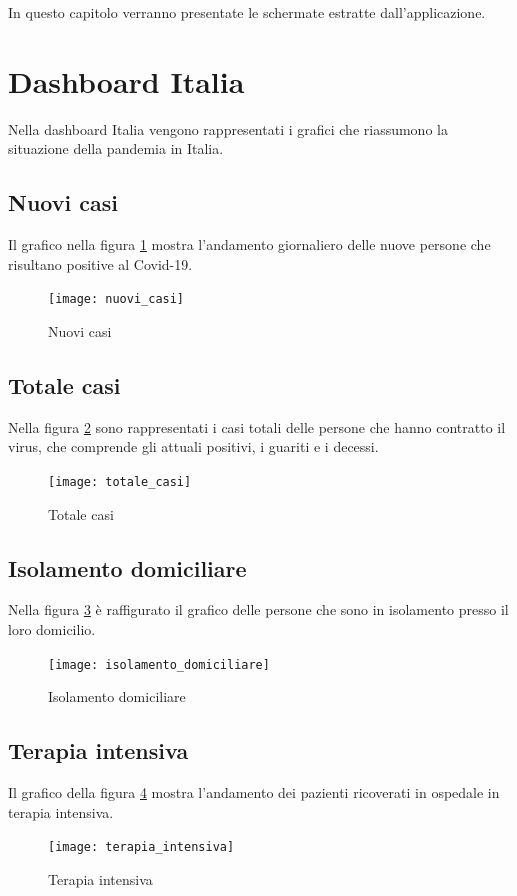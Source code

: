 \noindent In questo capitolo verranno presentate le schermate estratte dall'applicazione.
\section{Dashboard Italia}
Nella dashboard Italia vengono rappresentati i grafici che riassumono la situazione della pandemia in Italia.

\subsection{Nuovi casi}
Il grafico nella figura \ref{fig:nuovi_casi} mostra l'andamento giornaliero delle nuove persone che risultano positive al Covid-19.
\begin{figure}[htp]
    \centering
    \texttt{[image: nuovi\_casi]}
    \caption{Nuovi casi}
    \label{fig:nuovi_casi}
\end{figure}

\subsection{Totale casi}
Nella figura \ref{fig:totale_casi} sono rappresentati i casi totali delle persone che hanno contratto il virus, che comprende gli attuali positivi, i guariti e i decessi.
\begin{figure}[htp]
    \centering
    \texttt{[image: totale\_casi]}
    \caption{Totale casi}
    \label{fig:totale_casi}
\end{figure}

\subsection{Isolamento domiciliare}
Nella figura \ref{fig:isolamento_domiciliare} è raffigurato il grafico delle persone che sono in isolamento presso il loro domicilio.
\begin{figure}[htp]
    \centering
    \texttt{[image: isolamento\_domiciliare]}
    \caption{Isolamento domiciliare}
    \label{fig:isolamento_domiciliare}
\end{figure}

\subsection{Terapia intensiva}
Il grafico della figura \ref{fig:terapia_intensiva} mostra l'andamento dei pazienti ricoverati in ospedale in terapia intensiva.
\begin{figure}[htp]
    \centering
    \texttt{[image: terapia\_intensiva]}
    \caption{Terapia intensiva}
    \label{fig:terapia_intensiva}
\end{figure}

